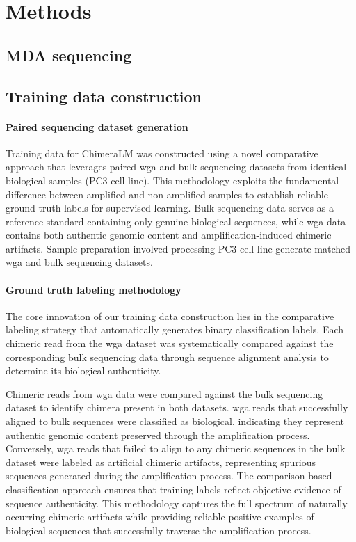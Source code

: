 \documentclass[pdflatex,sn-nature]{sn-jnl}%
\theoremstyle{thmstyleone}%
\theoremstyle{thmstyletwo}%
\theoremstyle{thmstylethree}%
\begin{document}
\section*{Methods}\label{sec:methods}

\subsection*{MDA sequencing}

\subsection*{Training data construction}

\paragraph{Paired sequencing dataset generation}
Training data for ChimeraLM was constructed using a novel comparative approach that leverages paired \gls{wga} and bulk sequencing datasets from identical biological samples (PC3 cell line).
This methodology exploits the fundamental difference between amplified and non-amplified samples to establish reliable ground truth labels for supervised learning.
Bulk sequencing data serves as a reference standard containing only genuine biological sequences, while \gls{wga} data contains both authentic genomic content and amplification-induced chimeric artifacts.
Sample preparation involved processing PC3 cell line generate matched \gls{wga} and bulk sequencing datasets.

\paragraph{Ground truth labeling methodology}
The core innovation of our training data construction lies in the comparative labeling strategy that automatically generates binary classification labels.
Each chimeric read from the \gls{wga} dataset was systematically compared against the corresponding bulk sequencing data through sequence alignment analysis to determine its biological authenticity.

Chimeric reads from \gls{wga} data were compared against the bulk sequencing dataset to identify chimera present in both datasets.
\gls{wga} reads that successfully aligned to bulk sequences were classified as biological, indicating they represent authentic genomic content preserved through the amplification process.
Conversely, \gls{wga} reads that failed to align to any chimeric sequences in the bulk dataset were labeled as artificial chimeric artifacts, representing spurious sequences generated during the amplification process.
The comparison-based classification approach ensures that training labels reflect objective evidence of sequence authenticity.
This methodology captures the full spectrum of naturally occurring chimeric artifacts while providing reliable positive examples of biological sequences that successfully traverse the amplification process.
\end{document}
